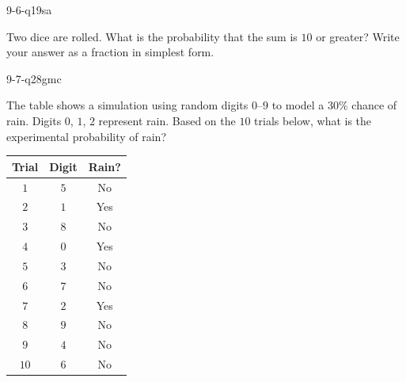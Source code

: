 \begin{practiceQuestion}{9-6-q19}{sa}
\begin{questionText}
Two dice are rolled. What is the probability that the sum is $10$ or greater? Write your answer as a fraction in simplest form.
\end{questionText}
\end{practiceQuestion}

\begin{practiceQuestion}{9-7-q28}{gmc}
\begin{questionText}
The table shows a simulation using random digits $0$--$9$ to model a $30\%$ chance of rain. Digits $0$, $1$, $2$ represent rain. Based on the $10$ trials below, what is the experimental probability of rain?

\begin{center}
\begin{tabular}{|c|c|c|}
\hline
\textbf{Trial} & \textbf{Digit} & \textbf{Rain?} \\
\hline
$1$ & $5$ & No \\
\hline
$2$ & $1$ & Yes \\
\hline
$3$ & $8$ & No \\
\hline
$4$ & $0$ & Yes \\
\hline
$5$ & $3$ & No \\
\hline
$6$ & $7$ & No \\
\hline
$7$ & $2$ & Yes \\
\hline
$8$ & $9$ & No \\
\hline
$9$ & $4$ & No \\
\hline
$10$ & $6$ & No \\
\hline
\end{tabular}
\end{center}
\end{questionText}
\end{practiceQuestion}
